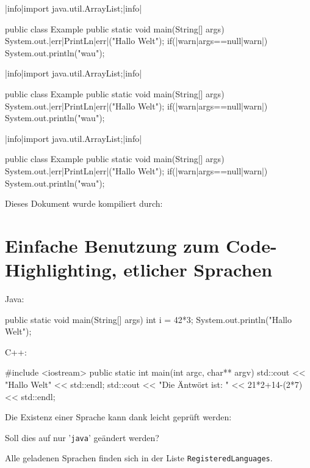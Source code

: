 \documentclass{article}
\begin{document}
\begin{sjava}
    |info|import java.util.ArrayList;|info|

    public class Example {
        public static void main(String[] args) {
            System.out.|err|PrintLn|err|("Hallo Welt");
            if(|warn|args==null|warn|)
                System.out.println("wau");
        }
    }
\end{sjava}

\begin{java}[caption={Hi}]
|info|import java.util.ArrayList;|info|

public class Example {
    public static void main(String[] args) {
        System.out.|err|PrintLn|err|("Hallo Welt");
        if(|warn|args==null|warn|)
            System.out.println("wau");
    }
}
\end{java}
\begin{latex}
\begin{java}
|info|import java.util.ArrayList;|info|

public class Example {
    public static void main(String[] args) {
        System.out.|err|PrintLn|err|("Hallo Welt");
        if(|warn|args==null|warn|)
            System.out.println("wau");
    }
}
\end{java}
\end{latex}

\begin{bemerkung}[Kompilierung]
    Dieses Dokument wurde kompiliert durch: \begin{center}
    \end{center}
\end{bemerkung}

\section{Einfache Benutzung zum Code-Highlighting, etlicher Sprachen}
Java:
\begin{java}
public static void main(String[] args) {
    int i = 42*3;
    System.out.println("Hallo Welt");
}
\end{java}
C++:
\begin{cpp}
#include <iostream>
public static int main(int argc, char** argv) {
    std::cout << "Hallo Welt" << std::endl;
    std::cout << "Die Äntwört ist: " << 21*2+14-(2*7) << std::endl;
}
\end{cpp}
Die Existenz einer Sprache kann dank  leicht geprüft werden:
\begin{latex}
\end{latex}
\begin{bemerkung}[Notation]
    Soll dies auf nur '\verb|java|' geändert werden?
\end{bemerkung}
Alle geladenen Sprachen finden sich in der Liste \verb|RegisteredLanguages|.
\end{document}
